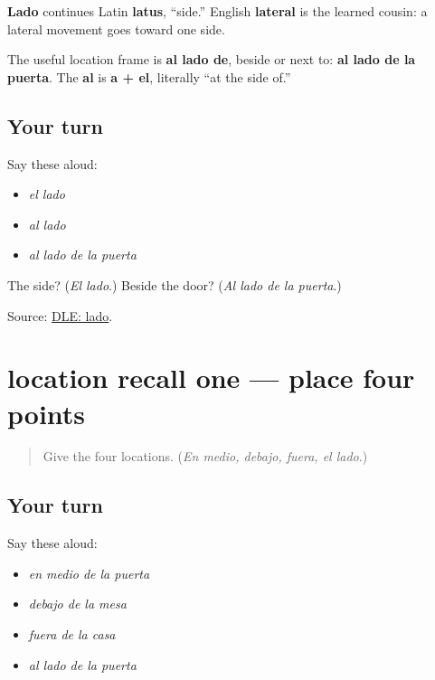 \begin{cousinweb}
\textbf{Lado} continues Latin \textbf{latus}, “side.” English \textbf{lateral} is the learned cousin: a lateral movement goes toward one side.
\end{cousinweb}

\begin{grammarlens}[title={Grammar Lens: al lado de}]
The useful location frame is \textbf{al lado de}, beside or next to: \textbf{al lado de la puerta}. The \textbf{al} is \textbf{a + el}, literally “at the side of.”
\end{grammarlens}

\subsection*{Your turn}
Say these aloud:

\begin{itemize}
\raggedright
  \item \emph{el lado}
  \item \emph{al lado}
  \item \emph{al lado de la puerta}
\end{itemize}

\begin{tcolorbox}[breakable,colback=teal!4,colframe=teal!35!black,title={Before you move on}]
The side? (\emph{El lado}.) Beside the door? (\emph{Al lado de la puerta}.)

Source: \href{https://dle.rae.es/lado}{DLE: lado}.
\end{tcolorbox}
\section[(review)]{location recall one — place four points}

\label{lesson:ES-C407-location-recall-1}



\begin{quote}
Give the four locations. (\emph{En medio, debajo, fuera, el lado}.)
\end{quote}

\subsection*{Your turn}
Say these aloud:

\begin{itemize}
\raggedright
  \item \emph{en medio de la puerta}
  \item \emph{debajo de la mesa}
  \item \emph{fuera de la casa}
  \item \emph{al lado de la puerta}
\end{itemize}

